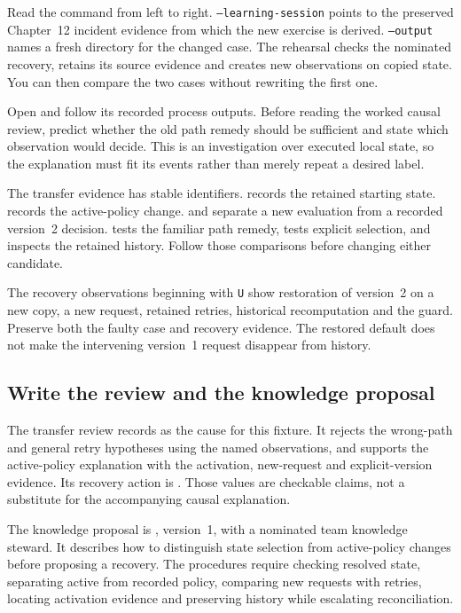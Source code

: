 Read the command from left to right. \texttt{--learning-session} points to the preserved Chapter~12 incident evidence from which the new exercise is derived. \texttt{--output} names a fresh directory for the changed case. The rehearsal checks the nominated recovery, retains its source evidence and creates new observations on copied state. You can then compare the two cases without rewriting the first one.

Open  and follow its recorded process outputs. Before reading the worked causal review, predict whether the old path remedy should be sufficient and state which observation would decide. This is an investigation over executed local state, so the explanation must fit its events rather than merely repeat a desired label.

The transfer evidence has stable identifiers.  records the retained starting state.  records the active-policy change.  and  separate a new evaluation from a recorded version~2 decision.  tests the familiar path remedy,  tests explicit selection, and  inspects the retained history. Follow those comparisons before changing either candidate.

The recovery observations beginning with \texttt{U} show restoration of version~2 on a new copy, a new request, retained retries, historical recomputation and the guard. Preserve both the faulty case and recovery evidence. The restored default does not make the intervening version~1 request disappear from history.

\subsection{Write the review and the knowledge proposal}

The transfer review records  as the cause for this fixture. It rejects the wrong-path and general retry hypotheses using the named observations, and supports the active-policy explanation with the activation, new-request and explicit-version evidence. Its recovery action is . Those values are checkable claims, not a substitute for the accompanying causal explanation.

The knowledge proposal is , version~1, with a nominated team knowledge steward. It describes how to distinguish state selection from active-policy changes before proposing a recovery. The procedures require checking resolved state, separating active from recorded policy, comparing new requests with retries, locating activation evidence and preserving history while escalating reconciliation.

